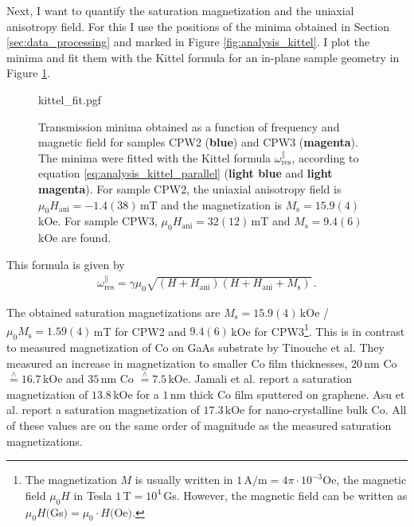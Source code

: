 Next, I want to quantify the saturation magnetization and the uniaxial anisotropy field. For this I use the positions of the minima obtained in Section \ref{sec:data_processing} and marked in Figure \ref{fig:analysis_kittel}. I plot the minima and fit them with the Kittel formula for an in-plane sample geometry in Figure \ref{fig:analysis_kittel_fit}. 
\begin{figure}[b]
    \centering
    {kittel_fit.pgf}
    \caption[Fitted transmission minima of samples CPW2 and CPW3]{Transmission minima obtained as a function of frequency and magnetic field for samples CPW2 (\textbf{\color{seeblau100}blue}) and CPW3 (\textbf{\color{antiseeblau100}magenta}). The minima were fitted with the Kittel formula $\omega_\text{res}^\parallel$, according to equation \ref{eq:analysis_kittel_parallel} (\textbf{\color{seeblau65}light blue} and \textbf{\color{antiseeblau65}light magenta}). For sample CPW2, the uniaxial anisotropy field is $\mu_0H_\text{ani}=-1.4(38)\,$mT and the magnetization is $M_\text{s}=15.9(4)\,$kOe. For sample CPW3, $\mu_0H_\text{ani}=32(12)\,$mT and $M_\text{s}=9.4(6)\,$kOe are found.}
    \label{fig:analysis_kittel_fit}
\end{figure}
This formula is given by
\begin{align}
    \omega_\text{res}^\parallel=\gamma\mu_0 \sqrt{(H+H_\text{ani})(H+H_\text{ani}+M_\text{s})}\,.\label{eq:analysis_kittel_parallel}
\end{align}


The obtained saturation magnetizations are $M_\text{s}=15.9(4)\,$kOe / $\mu_0M_\text{s}=1.59(4)\,$mT for CPW2 and $9.4(6)\,$kOe for CPW3\footnote{The magnetization $M$ is usually written in $1\,$A$/$m$=4\pi\cdot 10^{-3}$Oe, the magnetic field $\mu_0H$ in Tesla $1\,$T$=10^4\,$Gs. However, the magnetic field can be written as $\mu_0H($Gs$)=\mu_0\cdot H($Oe$)$.}.
This is in contrast to measured magnetization of Co on GaAs substrate by Tinouche et al. They measured an increase in magnetization to smaller Co film thicknesses, $20\,$nm Co $\overset{\wedge}{=}16.7\,$kOe and $35\,$nm Co $\overset{\wedge}{=}7.5\,$kOe.
Jamali et al. report a saturation magnetization of $13.8\,$kOe for a $1\,$nm thick Co film sputtered on graphene. Asu et al. report a saturation magnetization of $17.3\,$kOe for nano-crystalline bulk Co. All of these values are on the same order of magnitude as the measured saturation magnetizations. \cite{Tinouche2015,Jamali2014,Aus1998}

